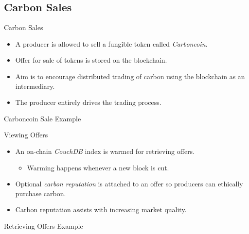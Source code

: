 \subsection{Carbon Sales}
\begin{frame}{Carbon Sales}
    \begin{itemize}
        \item A producer is allowed to sell a fungible token called
              \textit{Carboncoin}.
        \item Offer for sale of tokens is stored on the blockchain.
        \item Aim is to encourage distributed trading of carbon using the
              blockchain as an intermediary.
        \item The producer entirely drives the trading process.
    \end{itemize}
\end{frame}
\begin{frame}{Carboncoin Sale Example}
    \begin{adjustbox}{max totalsize={1\textwidth}{0.85\textheight},center}
        
    \end{adjustbox}
\end{frame}
\begin{frame}{Viewing Offers}
    \begin{itemize}
        \item An on-chain \textit{CouchDB} index is warmed for retrieving offers.
              \begin{itemize}
                  \item Warming happens whenever a new block is cut.
              \end{itemize}
        \item Optional \textit{carbon reputation} is attached to an offer
              so producers can ethically purchase carbon.
        \item Carbon reputation assists with increasing market quality.
    \end{itemize}
\end{frame}
\begin{frame}{Retrieving Offers Example}
    \begin{adjustbox}{max totalsize={1\textwidth}{0.85\textheight},center}
        
    \end{adjustbox}
\end{frame}
